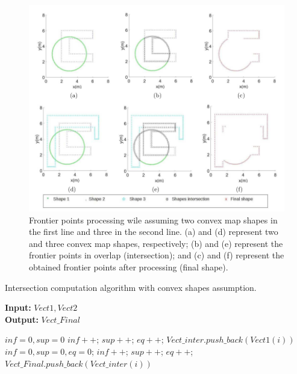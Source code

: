 \documentclass[11pt,openany]{book}
\begin{document}
\begin{figure}[H]
    \centering
    \includegraphics[scale=0.4]{assets/3_6.png}
    \caption{Frontier points processing wile assuming two convex map shapes in the first line and three in the second line. (a) and (d) represent two and three convex map shapes, respectively; (b) and (e) represent the frontier points in overlap (intersection); and (c) and (f) represent the obtained frontier points after processing (final shape).}
    \label{fig:3.6}
\end{figure}
\begin{algorithm}[H]
    \caption{Intersection computation algorithm with convex shapes assumption.}
    \label{alg:3.4}
    \hspace*{\algorithmicindent} \textbf{Input:} $Vect1, Vect2$ \\
    \hspace*{\algorithmicindent} \textbf{Output:} $Vect\_Final$
    \begin{algorithmic}[1]
        \STATE $inf = 0, sup = 0$
        \STATE $inf++$;
        \STATE $sup++$;
        \ELSE
        \STATE $eq++$;
        \ENDIF
        \ENDFOR
        \STATE $Vect\_inter.push\_back(Vect1(i))$
        \ENDIF
        \ENDFOR
        \STATE $inf=0,sup=0, eq=0$;
        \STATE $inf++$;
        \STATE $sup++$;
        \ELSE
        \STATE $eq++$;
        \ENDIF
        \ENDIF
        \ENDFOR
        \STATE $Vect\_Final.push\_back(Vect\_inter(i))$
        \ENDIF
        \ENDFOR
    \end{algorithmic}
\end{algorithm}
\end{document}
